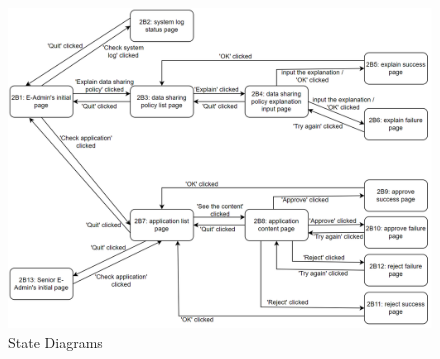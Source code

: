 \begin{figure}[H]
    \centering
    \includegraphics[width=0.75\linewidth]{picture/201391923.png}
    \caption{State Diagrams}
    \label{fig:enter-label}
\end{figure}

